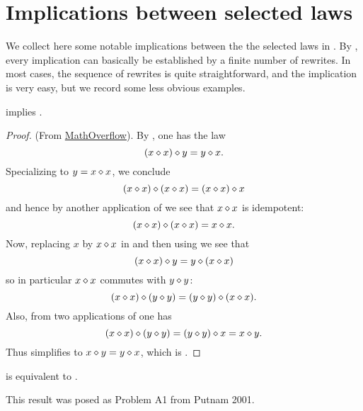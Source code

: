 \chapter{Implications between selected laws}

We collect here some notable implications between the the selected laws in .   By , every implication can basically be established by a finite number of rewrites.  In most cases, the sequence of rewrites is quite straightforward, and the implication is very easy, but we record some less obvious examples.

\begin{theorem}[387 implies 43]\label{387_implies_43}\leanok  {} implies .
\end{theorem}

\begin{proof}\leanok (From \href{https://mathoverflow.net/a/450905/766}{MathOverflow}).
  By , one has the law
\begin{equation}\label{387-again}
  (x \diamond x) \diamond y = y \diamond x.
\end{equation}
Specializing to $y=x \diamond x$, we conclude
$$(x \diamond x) \diamond (x \diamond x) = (x \diamond x) \diamond x$$
and hence by another application of  we see that $x \diamond x$ is idempotent:
\begin{equation}\label{idem}
  (x \diamond x) \diamond (x \diamond x) = x \diamond x.
\end{equation}
Now, replacing $x$ by $x \diamond x$ in  and then using  we see that
$$ (x \diamond x) \diamond y = y \diamond (x \diamond x)$$
so in particular $x \diamond x$ commutes with $y \diamond y$:
\begin{equation}\label{op-idem} (x \diamond x) \diamond (y \diamond y) = (y \diamond y) \diamond (x \diamond x).
\end{equation}
Also, from two applications of  one has
$$(x \diamond x) \diamond (y \diamond y) = (y \diamond y) \diamond x = x \diamond y.$$
Thus  simplifies to $x \diamond y = y \diamond x$, which is .
\end{proof}

\begin{theorem}[29 equivalent to 14]\label{29_equiv_14} \leanok  {} is equivalent to .
\end{theorem}

This result was posed as Problem A1 from Putnam 2001.

